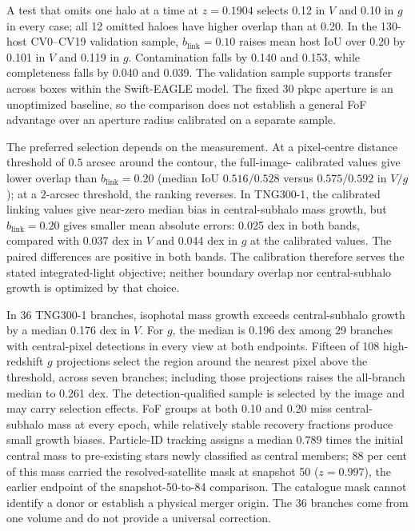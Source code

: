 \documentclass[usenatbib]{mnras}
\begin{document}
A test that omits one halo at a time at $z=0.1904$ selects 0.12 in $V$
and 0.10 in $g$ in every case; all 12 omitted haloes have higher overlap
than at 0.20.
In the 130-host CV0--CV19 validation sample, $b_{\mathrm{link}}=0.10$
raises mean host IoU over 0.20 by 0.101 in $V$ and 0.119 in $g$.
Contamination falls by 0.140 and 0.153, while completeness falls by
0.040 and 0.039. The validation sample supports transfer across boxes within the
Swift-EAGLE model. The fixed 30 pkpc aperture is an unoptimized baseline,
so the comparison does not establish a general FoF advantage over an
aperture radius calibrated on a separate sample.

The preferred selection depends on the measurement. At a pixel-centre
distance threshold of $0.5$ arcsec around the contour, the full-image-
calibrated values give lower overlap than
$b_{\mathrm{link}}=0.20$ (median IoU $0.516/0.528$ versus $0.575/0.592$
in $V/g$); at a $2$-arcsec threshold, the ranking reverses. In TNG300-1, the
calibrated linking values give near-zero median
bias in central-subhalo mass growth, but $b_{\mathrm{link}}=0.20$ gives
smaller mean absolute errors: 0.025 dex in both bands, compared with
0.037 dex in $V$ and 0.044 dex in $g$ at the calibrated values. The
paired differences are positive in both bands. The calibration therefore
serves the stated integrated-light objective; neither boundary overlap
nor central-subhalo growth is optimized by that choice.

In 36 TNG300-1 branches, isophotal mass growth exceeds central-subhalo
growth by a median 0.176 dex in $V$. For $g$, the median is 0.196 dex
among 29 branches with central-pixel detections in every view at both
endpoints. Fifteen of 108 high-redshift $g$ projections select the
region around the nearest pixel above the threshold, across seven
branches; including those projections raises the all-branch median to
0.261 dex. The detection-qualified
sample is selected by the image and may carry selection effects.
FoF groups at both 0.10 and 0.20 miss central-subhalo mass at every
epoch, while relatively stable recovery fractions produce small growth
biases. Particle-ID tracking assigns a median $0.789$ times the initial
central mass to pre-existing stars newly classified as central members;
88 per cent of this mass carried the resolved-satellite mask at snapshot 50
($z=0.997$), the earlier endpoint of the snapshot-50-to-84 comparison.
The catalogue mask cannot identify a donor or establish a
physical merger origin. The 36 branches come from one volume and do not
provide a universal correction.
\end{document}
